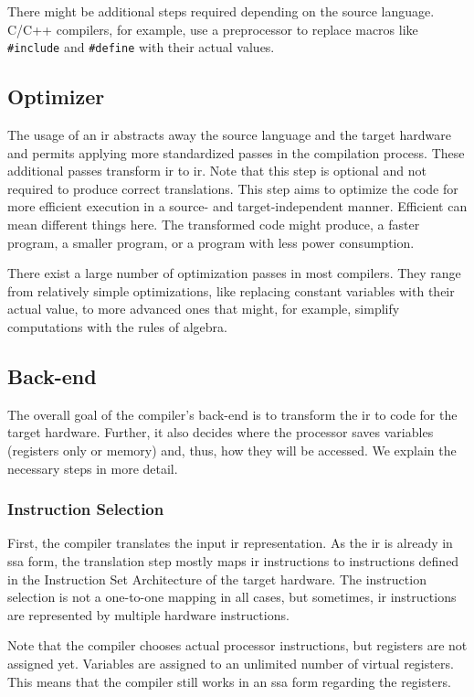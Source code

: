 There might be additional steps required depending on the source language.
C/C++ compilers, for example, use a preprocessor to replace macros like \lstinline{#include} and \lstinline{#define} with their actual values.

\subsection{Optimizer}
\label{sec:bg:compilers:optimizer}
The usage of an \ac{ir} abstracts away the source language and the target hardware and permits applying more standardized passes in the compilation process.
These additional passes transform \ac{ir} to \ac{ir}.
Note that this step is optional and not required to produce correct translations.
This step aims to optimize the code for more efficient execution in a source- and target-independent manner.
Efficient can mean different things here.
The transformed code might produce, \eg a faster program, a smaller program, or a program with less power consumption.

There exist a large number of optimization passes in most compilers.
They range from relatively simple optimizations, like replacing constant variables with their actual value, to more advanced ones that might, for example, simplify computations with the rules of algebra.

\subsection{Back-end}
\label{sec:bg:compilers:backend}
The overall goal of the compiler's back-end is to transform the \ac{ir} to code for the target hardware.
Further, it also decides where the processor saves variables (registers only or memory) and, thus, how they will be accessed.
We explain the necessary steps in more detail.

\subsubsection{Instruction Selection}
First, the compiler translates the input \ac{ir} representation.
As the \ac{ir} is already in \ac{ssa} form, the translation step mostly maps \ac{ir} instructions to instructions defined in the Instruction Set Architecture of the target hardware.
The instruction selection is not a one-to-one mapping in all cases, but sometimes, \ac{ir} instructions are represented by multiple hardware instructions.

Note that the compiler chooses actual processor instructions, but registers are not assigned yet.
Variables are assigned to an unlimited number of virtual registers.
This means that the compiler still works in an \ac{ssa} form regarding the registers.

